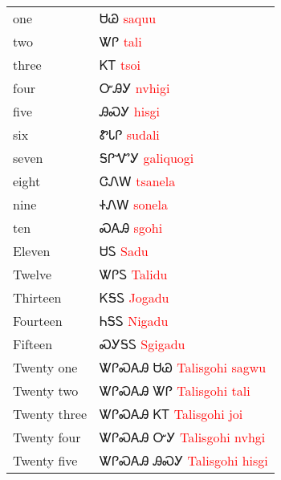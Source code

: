 \begin{minipage}{\linewidth}
\begin{tabular}{p{3cm} p{11cm}}
one & ᏌᏊ 
 \newline \textcolor{red}{saquu}\\
two & ᏔᎵ 
 \newline \textcolor{red}{tali}\\
three & ᏦᎢ 
 \newline \textcolor{red}{tsoi}\\
four & ᏅᎯᎩ 
 \newline \textcolor{red}{nvhigi}\\
five & ᎯᏍᎩ 
 \newline \textcolor{red}{hisgi}\\
six & ᏑᏓᎵ 
 \newline \textcolor{red}{sudali}\\
seven & ᎦᎵᏉᎩ 
 \newline \textcolor{red}{galiquogi}\\
eight & ᏣᏁᎳ 
 \newline \textcolor{red}{tsanela}\\
nine & ᏐᏁᎳ 
 \newline \textcolor{red}{sonela}\\
ten & ᏍᎪᎯ 
 \newline \textcolor{red}{sgohi}\\
Eleven & ᏌᏚ 
 \newline \textcolor{red}{Sadu}\\
Twelve & ᏔᎵᏚ 
 \newline \textcolor{red}{Talidu}\\
Thirteen & ᏦᎦᏚ 
 \newline \textcolor{red}{Jogadu}\\
Fourteen & ᏂᎦᏚ 
 \newline \textcolor{red}{Nigadu}\\
Fifteen & ᏍᎩᎦᏚ 
 \newline \textcolor{red}{Sgigadu}\\
Twenty one & ᏔᎵᏍᎪᎯ ᏌᏊ 
 \newline \textcolor{red}{Talisgohi sagwu}\\
Twenty two & ᏔᎵᏍᎪᎯ ᏔᎵ 
 \newline \textcolor{red}{Talisgohi tali}\\
Twenty three & ᏔᎵᏍᎪᎯ ᏦᎢ 
 \newline \textcolor{red}{Talisgohi joi}\\
Twenty four & ᏔᎵᏍᎪᎯ ᏅᎩ 
 \newline \textcolor{red}{Talisgohi nvhgi}\\
Twenty five & ᏔᎵᏍᎪᎯ ᎯᏍᎩ 
 \newline \textcolor{red}{Talisgohi hisgi}\\
\end{tabular}
\end{minipage}

